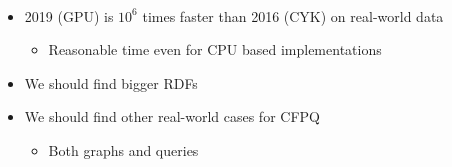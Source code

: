 \documentclass[a0paper,portrait]{baposter}
\begin{document}
\begin{poster}
{\begin{minipage}[t]{0.5\textwidth}
\end{minipage}
~
\begin{minipage}[t]{0.48\textwidth}
  \begin{itemize}
    \item 2019 (GPU) is $10^6$ times faster than 2016 (CYK) on real-world data
    \begin{itemize}
       \item Reasonable time even for CPU based implementations
    \end{itemize}
    \item We should find bigger RDFs
    \item We should find other real-world cases for CFPQ
    \begin{itemize}
       \item Both graphs and queries
    \end{itemize}

  \end{itemize}
\end{minipage}
}

\end{poster}
\end{document}
